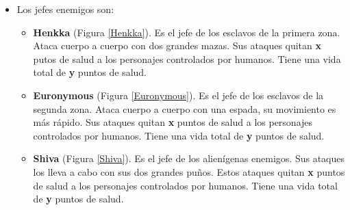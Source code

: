 \begin{itemize}
\item Los jefes enemigos son:
\begin{itemize}
\item \textbf{Henkka} (Figura \ref{Henkka}). Es el jefe de los esclavos de la primera zona. Ataca cuerpo a cuerpo con dos grandes mazas. Sus ataques quitan \textbf{x}  putos de salud a los personajes controlados por humanos. Tiene una vida total de \textbf{y}  puntos de salud.
\item \textbf{Euronymous} (Figura \ref{Euronymous}). Es el jefe de los esclavos de la segunda zona. Ataca cuerpo a cuerpo con una espada, su movimiento es más rápido. Sus ataques quitan \textbf{x}  puntos de salud a los personajes controlados por humanos. Tiene una vida total de \textbf{y}  puntos de salud.
\item \textbf{Shiva} (Figura \ref{Shiva}). Es el jefe de los alienígenas enemigos. Sus ataques los lleva a cabo con sus dos grandes puños. Estos ataques quitan \textbf{x}  puntos de salud a los personajes controlados por humanos. Tiene una vida total de \textbf{y}  puntos de salud.
\end{itemize}


\end{itemize}

